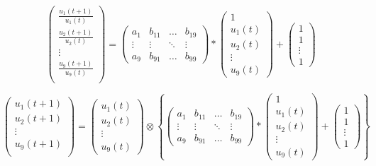 \documentclass[11pt]{article}
\begin{document}
\begin{equation}
	\begin{pmatrix}
		\frac{u_{1}(t+1)}{u_{1}(t)} \\
		\frac{u_{2}(t+1)}{u_{2}(t)} \\
		\vdots \\
		\frac{u_{9}(t+1)}{u_{9}(t)} \\
	\end{pmatrix}
	=
	\begin{pmatrix}
		a_{1} & b_{11} & \ldots & b_{19} \\
		\vdots & \vdots & \ddots & \vdots \\
		a_{9} & b_{91} & \ldots & b_{99}
	\end{pmatrix}
	\ast
	\begin{pmatrix}
		1 \\
		u_{1}(t) \\
		u_{2}(t) \\
		\vdots \\
		u_{9}(t)
	\end{pmatrix}
	+
	\begin{pmatrix}
		1 \\
		1 \\
		\vdots \\
		1
	\end{pmatrix}
\end{equation}

\begin{equation}
	\begin{pmatrix}
		u_{1}(t+1) \\
		u_{2}(t+1)\\
		\vdots \\
		u_{9}(t+1) \\
	\end{pmatrix}
	=
	\begin{pmatrix}
		u_{1}(t) \\
		u_{2}(t) \\
		\vdots \\
		u_{9}(t)
	\end{pmatrix}
	\otimes 
	\left \{
	\begin{pmatrix}
		a_{1} & b_{11} & \ldots & b_{19} \\
		\vdots & \vdots & \ddots & \vdots \\
		a_{9} & b_{91} & \ldots & b_{99}
	\end{pmatrix}	
	\ast
	\begin{pmatrix}
		1 \\
		u_{1}(t) \\
		u_{2}(t) \\
		\vdots \\
		u_{9}(t)
	\end{pmatrix}
	+
	\begin{pmatrix}
		1 \\
		1 \\
		\vdots \\
		1
	\end{pmatrix}
	\right \}
\end{equation}
\end{document}
